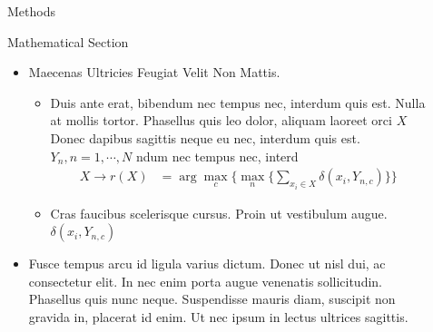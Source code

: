 \documentclass[final,hyperref={pdfpagelabels=false}]{beamer}
\begin{document}
\begin{frame}[t]
\begin{columns}[t]
\begin{column}{.465\textwidth}
\begin{block}{Methods}
\end{block}


\begin{block}{Mathematical Section}

\begin{itemize}
\item Maecenas Ultricies Feugiat Velit Non Mattis.
\begin{itemize}
\item Duis ante erat, bibendum nec tempus nec, interdum quis est. Nulla at mollis tortor. Phasellus quis leo dolor, aliquam laoreet orci $X$ Donec dapibus sagittis neque eu nec, interdum quis est. $Y_n, n=1,\cdots,N$ ndum nec tempus nec, interd
\begin{align*}
X \rightarrow r(X) & = \arg \max_{c} \Big\{ \max_n \big\{ \sum_{x_i \in X} \delta(x_i,Y_{n,c})\big\} \Big\} 
\end{align*}
\item Cras faucibus scelerisque cursus. Proin ut vestibulum augue. $\delta(x_i,Y_{n,c})$
\end{itemize}
\item Fusce tempus arcu id ligula varius dictum. Donec ut nisl dui, ac consectetur elit. In nec enim porta augue venenatis sollicitudin. Phasellus quis nunc neque. Suspendisse mauris diam, suscipit non gravida in, placerat id enim. Ut nec ipsum in lectus ultrices sagittis.
\end{itemize}

\end{block}


\end{column} %

\begin{column}{.03\textwidth}\end{column} %
 
\begin{column}{.465\textwidth} %



\end{column}
\end{columns}
\end{frame}
\end{document}
